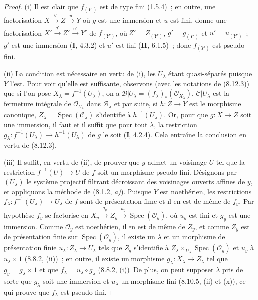 \begin{proof}
(i) Il est clair que $f_{(Y')}$ est de type fini (1.5.4)~; en outre, une
factorisation
$X\xrightarrow{g}Z\xrightarrow{u}Y$ où $g$ est une immersion et $u$ est
fini, donne une factorisation
$X'\xrightarrow{g'}Z'\xrightarrow{u'}Y'$ de $f_{(Y')}$, où
$Z'=Z_{(Y')}$, $g'=g_{(Y')}$ et $u'=u_{(Y')}$~; $g'$ est une immersion
(\textbf{I}, 4.3.2) et $u'$ est fini (\textbf{II}, 6.1.5)~; donc $f_{(Y')}$ est pseudo-fini.

(ii) La condition est nécessaire en vertu de (i), les $U_\lambda$ étant
quasi-séparés puisque $Y$ l'est. Pour voir qu'elle est suffisante, observons
(avec les notations de (8.12.3)) que si l'on pose
$X_\lambda=f^{-1}(U_\lambda)$, on a
$\mathcal B|U_\lambda=(f_\lambda)_*(\mathcal O_{X_\lambda})$,
$\mathcal C|U_\lambda$ est la fermeture intégrale de $\mathcal O_{U_\lambda}$
dans $\mathcal B_\lambda$ et par suite, si $h:Z\to Y$ est le morphisme
canonique, $Z_\lambda=\operatorname{Spec}(\mathcal C_\lambda)$ s'identifie à
$h^{-1}(U_\lambda)$. Or, pour que $g:X\to Z$ soit une immersion, il faut et
il suffit que pour tout $\lambda$, la restriction
$g_\lambda:f^{-1}(U_\lambda)\to h^{-1}(U_\lambda)$ de $g$ le soit
(\textbf{I}, 4.2.4). Cela entraîne la conclusion en vertu de (8.12.3).

(iii) Il suffit, en vertu de (ii), de prouver que $y$ admet un voisinage $U$
tel que la restriction $f^{-1}(U)\to U$ de $f$ soit un morphisme pseudo-fini.
Désignons par $(U_\lambda)$ le système projectif filtrant décroissant des
voisinages ouverts affines de $y$, et appliquons la méthode de (8.1.2,
\emph{a)}). Puisque $Y$ est noethérien, les restrictions
$f_\lambda:f^{-1}(U_\lambda)\to U_\lambda$ de $f$ sont de présentation
finie et il en est de même de $f_y$. Par hypothèse $f_y$ se factorise en
$X_y\xrightarrow{g_y}Z_y\xrightarrow{u_y}\operatorname{Spec}(\mathcal O_y)$,
où $u_y$ est fini et $g_y$ est une immersion. Comme $\mathcal O_y$ est
noethérien, il en est de même de $Z_y$, et comme $Z_y$ est de présentation
finie sur $\operatorname{Spec}(\mathcal O_y)$, il existe un $\lambda$ et un
morphisme de présentation finie $u_\lambda:Z_\lambda\to U_\lambda$ tels que
$Z_y$ s'identifie à
$Z_\lambda\times_{U_\lambda}\operatorname{Spec}(\mathcal O_y)$ et $u_y$ à
$u_\lambda\times 1$ (8.8.2, (ii))~; en outre, il existe un morphisme
$g_\lambda:X_\lambda\to Z_\lambda$ tel que $g_y=g_\lambda\times 1$ et que
$f_\lambda=u_\lambda\circ g_\lambda$ (8.8.2, (i)). De plus, on peut supposer
$\lambda$ pris de sorte que $g_\lambda$ soit une immersion et $u_\lambda$ un
morphisme fini (8.10.5, (ii) et (x)), ce qui prouve que $f_\lambda$ est
pseudo-fini.
\end{proof}

